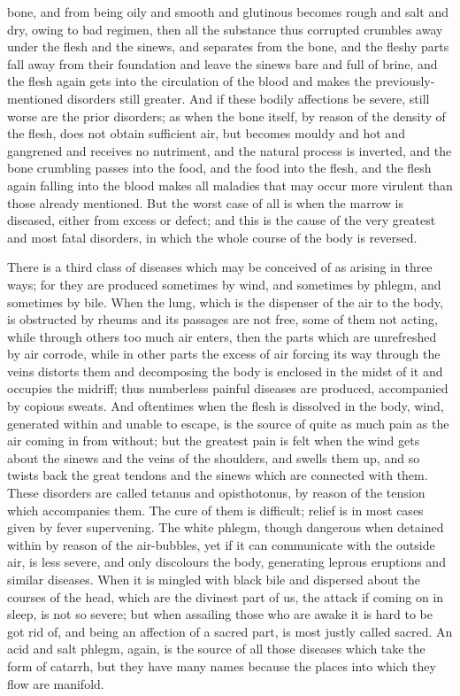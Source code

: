 bone, and from being oily and smooth and glutinous becomes rough and salt
and dry, owing to bad regimen, then all the substance thus corrupted
crumbles away under the flesh and the sinews, and separates from the bone,
and the fleshy parts fall away from their foundation and leave the sinews
bare and full of brine, and the flesh again gets into the circulation of
the blood and makes the previously-mentioned disorders still greater. And
if these bodily affections be severe, still worse are the prior disorders;
as when the bone itself, by reason of the density of the flesh, does not
obtain sufficient air, but becomes mouldy and hot and gangrened and
receives no nutriment, and the natural process is inverted, and the bone
crumbling passes into the food, and the food into the flesh, and the flesh
again falling into the blood makes all maladies that may occur more
virulent than those already mentioned. But the worst case of all is when
the marrow is diseased, either from excess or defect; and this is the
cause of the very greatest and most fatal disorders, in which the whole
course of the body is reversed.

There is a third class of diseases which may be conceived of as arising in
three ways; for they are produced sometimes by wind, and sometimes by
phlegm, and sometimes by bile. When the lung, which is the dispenser of
the air to the body, is obstructed by rheums and its passages are not
free, some of them not acting, while through others too much air enters,
then the parts which are unrefreshed by air corrode, while in other parts
the excess of air forcing its way through the veins distorts them and
decomposing the body is enclosed in the midst of it and occupies the
midriff; thus numberless painful diseases are produced, accompanied by
copious sweats. And oftentimes when the flesh is dissolved in the body,
wind, generated within and unable to escape, is the source of quite as
much pain as the air coming in from without; but the greatest pain is felt
when the wind gets about the sinews and the veins of the shoulders, and
swells them up, and so twists back the great tendons and the sinews which
are connected with them. These disorders are called tetanus and
opisthotonus, by reason of the tension which accompanies them. The cure of
them is difficult; relief is in most cases given by fever supervening. The
white phlegm, though dangerous when detained within by reason of the
air-bubbles, yet if it can communicate with the outside air, is less
severe, and only discolours the body, generating leprous eruptions and
similar diseases. When it is mingled with black bile and dispersed about
the courses of the head, which are the divinest part of us, the attack if
coming on in sleep, is not so severe; but when assailing those who are
awake it is hard to be got rid of, and being an affection of a sacred
part, is most justly called sacred. An acid and salt phlegm, again, is the
source of all those diseases which take the form of catarrh, but they have
many names because the places into which they flow are manifold.

